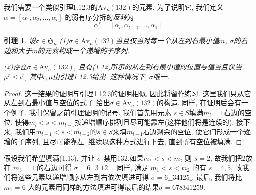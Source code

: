 \documentclass{ctexbook}
\newtheorem{lem}[thm]{引理}
\begin{document}
我们需要一个类似引理1.12.3的$\mathrm{Av}_{n}(132)$的元素. 为了说明它, 我们定义$\alpha=\left[\alpha_{1}, \alpha_{2}, \ldots, \alpha_{l}\right]$
的弱有序分拆的\textsl{反转}为
$$
\alpha^{r}=\left[\alpha_{l}, \alpha_{l-1}, \ldots, \alpha_{1}\right]
$$
         \begin{lem}
设$\sigma \in \mathfrak{S}_{n}$
\noindent
(1)$\sigma \in \mathrm{Av}_{n}(132)$当且仅当对每一个从左到右最小值$m$, $\sigma$的右边和大于$m$的元素构成一个递增的子序列.

\noindent
(2)存在$\sigma \in \mathrm{Av}_{n}(132)$, 且有(1.12)所示的从左到右最小值的位置与值当且仅当$\mu^{r} \unlhd \iota^{r}$, 其中$\iota, \mu$由引理1.12.3给出. 这种情况下,  $\sigma$唯一.
      \end{lem}
      	 \begin{proof}
      	这一结果的证明与引理1.12.3的证明相似, 因此将留作练习. 这里我们只从它从左到右最小值与空位的式子
      	给出$\sigma \in \mathrm{Av}_{n}(132)$的构造. 同样, 在证明后会有一个例子. 我们保留之前引理证明的记号. 我们首先用元素
      	$s \in S$填满$m_{l}=1$右边的空位, 使得$m_{l}<s<m_{l-1}$按递增顺序排列且尽可能靠左(这样他们将是连续的).
      	接下来, 我们用$m_{l-1}<s<m_{l-2}$的$s \in S$来填$m_{l-1}$右边剩余的空位, 使它们形成一个递增的子序列, 且尽可能靠左.
      	继续以这种方式进行下去, 直到所有空位被填满.
      \end{proof}

假设我们希望填满(1.13), 并让 $\sigma$ 禁用132.如果$m_{3}<s<m_{2}$ 则 $s=2$, 故我们把2放在 $m_{3}=1$ 的右边可得
$\sigma=6\_ \_3\_ 12\_ \_$. 同样, 满足  $m_{1}<s<m_{2}$ 的有 $s=4,5$, 故我们将这些元素以递增顺序从左到右依次填进可得
$\sigma=6\_ \_34125\_$. 最后, 我们将比$m_{1}=6$ 大的元素用同样的方法填进可得最后的结果$\sigma=6 7 8341259$.
\end{document}
